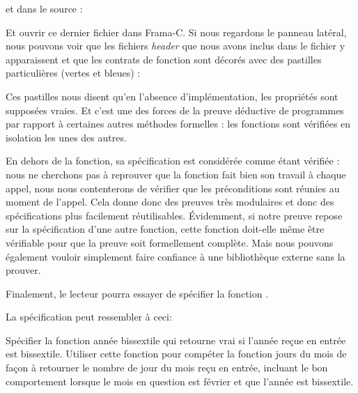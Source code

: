 


et dans le source :






Et ouvrir ce dernier fichier dans Frama-C. Si nous regardons le panneau latéral,
nous pouvons voir que les fichiers \textit{header} que nous avons inclus dans le fichier
 y apparaissent et que les contrats de fonction sont décorés avec des
pastilles particulières (vertes et bleues) :





Ces pastilles nous disent qu'en l'absence d'implémentation, les propriétés sont
supposées vraies. Et c'est une des forces de la preuve déductive de programmes
par rapport à certaines autres méthodes formelles : les fonctions sont vérifiées
en isolation les unes des autres.



En dehors de la fonction, sa spécification est considérée comme étant
vérifiée : nous ne cherchons pas à reprouver que la fonction fait bien son travail
à chaque appel, nous nous contenterons de vérifier que les préconditions sont
réunies au moment de l'appel. Cela donne donc des preuves très modulaires et donc
des spécifications plus facilement réutilisables. Évidemment, si notre preuve
repose sur la spécification d'une autre fonction, cette fonction doit-elle même
être vérifiable pour que la preuve soit formellement complète. Mais nous pouvons
également vouloir simplement faire confiance à une bibliothèque externe sans la
prouver.



Finalement, le lecteur pourra essayer de spécifier la fonction .



La spécification peut ressembler à ceci:









\label{l4:contract-modularity-ex-days-of-month}


Spécifier la fonction année bissextile qui retourne vrai si l'année reçue
en entrée est bissextile. Utiliser cette fonction pour compéter la fonction
jours du mois de façon à retourner le nombre de jour du mois reçu en entrée,
incluant le bon comportement lorsque le mois en question est février et que
l'année est bissextile.


